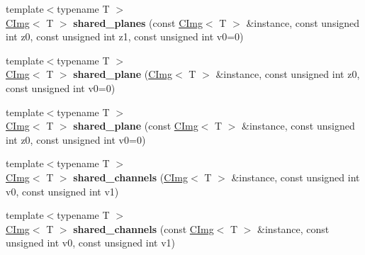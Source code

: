 \begin{DoxyCompactItemize}
\item 
\hypertarget{namespacecimg__library_acda942d1c25d10fa99f5cf6d4c18e816}{{\footnotesize template$<$typename T $>$ }\\\hyperlink{structcimg__library_1_1_c_img}{C\-Img}$<$ T $>$ {\bfseries shared\-\_\-planes} (const \hyperlink{structcimg__library_1_1_c_img}{C\-Img}$<$ T $>$ \&instance, const unsigned int z0, const unsigned int z1, const unsigned int v0=0)}\label{namespacecimg__library_acda942d1c25d10fa99f5cf6d4c18e816}

\item 
\hypertarget{namespacecimg__library_a36f3195a562b90ef1afec18c97f5b59d}{{\footnotesize template$<$typename T $>$ }\\\hyperlink{structcimg__library_1_1_c_img}{C\-Img}$<$ T $>$ {\bfseries shared\-\_\-plane} (\hyperlink{structcimg__library_1_1_c_img}{C\-Img}$<$ T $>$ \&instance, const unsigned int z0, const unsigned int v0=0)}\label{namespacecimg__library_a36f3195a562b90ef1afec18c97f5b59d}

\item 
\hypertarget{namespacecimg__library_a80756bfec1ee32aa0ec871ca9efd73c7}{{\footnotesize template$<$typename T $>$ }\\\hyperlink{structcimg__library_1_1_c_img}{C\-Img}$<$ T $>$ {\bfseries shared\-\_\-plane} (const \hyperlink{structcimg__library_1_1_c_img}{C\-Img}$<$ T $>$ \&instance, const unsigned int z0, const unsigned int v0=0)}\label{namespacecimg__library_a80756bfec1ee32aa0ec871ca9efd73c7}

\item 
\hypertarget{namespacecimg__library_a2b5812cfa20d14528b7aca6fc76a051e}{{\footnotesize template$<$typename T $>$ }\\\hyperlink{structcimg__library_1_1_c_img}{C\-Img}$<$ T $>$ {\bfseries shared\-\_\-channels} (\hyperlink{structcimg__library_1_1_c_img}{C\-Img}$<$ T $>$ \&instance, const unsigned int v0, const unsigned int v1)}\label{namespacecimg__library_a2b5812cfa20d14528b7aca6fc76a051e}

\item 
\hypertarget{namespacecimg__library_aad0b29dbc038e66061b4b7998cea7b4c}{{\footnotesize template$<$typename T $>$ }\\\hyperlink{structcimg__library_1_1_c_img}{C\-Img}$<$ T $>$ {\bfseries shared\-\_\-channels} (const \hyperlink{structcimg__library_1_1_c_img}{C\-Img}$<$ T $>$ \&instance, const unsigned int v0, const unsigned int v1)}\label{namespacecimg__library_aad0b29dbc038e66061b4b7998cea7b4c}


\end{DoxyCompactItemize}
